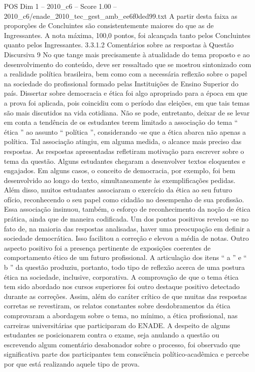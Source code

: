 \begin{textsample}{POS Dim 1 – 2010\_c6 – Score 1.00 – 2010\_c6/enade\_2010\_tec\_gest\_amb\_ee6f0ded99.txt}
A partir desta faixa as proporções de Concluintes são consistentemente maiores do que as de Ingressantes.
A nota máxima, 100,0 pontos, foi alcançada tanto pelos Concluintes quanto pelos Ingressantes. 3.3.1.2 Comentários sobre as respostas à Questão Discursiva 9 No que tange mais precisamente à atualidade do tema proposto e ao desenvolvimento do conteúdo, deve ser ressaltado que se mostrou sintonizado com a realidade política brasileira, bem como com a necessária reflexão sobre o papel na sociedade do profissional formado pelas Instituições de Ensino Superior do país.
Dissertar sobre democracia e ética foi algo apropriado para a época em que a prova foi aplicada, pois coincidiu com o período das eleições, em que tais temas são mais discutidos na vida cotidiana.
Não se pode, entretanto, deixar de se levar em conta a tendência de os estudantes terem limitado a associação do tema “ ética ” ao assunto “ política ”, considerando -se que a ética abarca não apenas a política.
Tal associação atingiu, em alguma medida, o alcance mais preciso das respostas.
As respostas apresentadas refletiram motivação para escrever sobre o tema da questão.
Alguns estudantes chegaram a desenvolver textos eloquentes e engajados.
Em alguns casos, o conceito de democracia, por exemplo, foi bem desenvolvido ao longo do texto, simultaneamente às exemplificações pedidas.
Além disso, muitos estudantes associaram o exercício da ética ao seu futuro ofício, reconhecendo o seu papel como cidadão no desempenho de sua profissão.
Essa associação insinuou, também, o esforço de reconhecimento da noção de ética prática, ainda que de maneira codificada.
Um dos pontos positivos revelou -se no fato de, na maioria das respostas analisadas, haver uma preocupação em definir a sociedade democrática.
Isso facilitou a correção e elevou a média de notas.
Outro aspecto positivo foi a presença pertinente de exposições coerentes de comportamento ético de um futuro profissional.
A articulação dos itens “ a ” e “ b ” da questão produziu, portanto, todo tipo de reflexão acerca de uma postura ética na sociedade, inclusive, corporativa.
A comprovação de que o tema ética tem sido abordado nos cursos superiores foi outro destaque positivo detectado durante as correções.
Assim, além do caráter crítico de que muitas das respostas corretas se revestiram, os relatos constantes sobre desdobramentos da ética comprovaram a abordagem sobre o tema, no mínimo, a ética profissional, nas carreiras universitárias que participaram do ENADE.
A despeito de alguns estudantes se posicionarem contra o exame, seja anulando a questão ou escrevendo algum comentário desabonador sobre o processo, foi observado que significativa parte dos participantes tem consciência político-acadêmica e percebe por que está realizando aquele tipo de prova.

\end{textsample}
